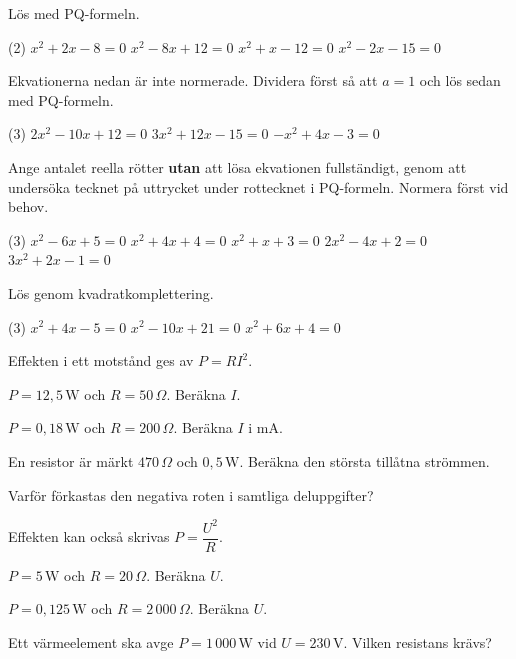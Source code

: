 Lös med PQ-formeln.
\begin{delar}(2)
  \task $x^2 + 2x - 8 = 0$
  \task $x^2 - 8x + 12 = 0$
  \task $x^2 + x - 12 = 0$
  \task $x^2 - 2x - 15 = 0$
\end{delar}

Ekvationerna nedan är inte normerade. Dividera först så att $a = 1$ och lös sedan med PQ-formeln.
\begin{delar}(3)
  \task $2x^2 - 10x + 12 = 0$
  \task $3x^2 + 12x - 15 = 0$
  \task $-x^2 + 4x - 3 = 0$
\end{delar}

Ange antalet reella rötter \textbf{utan} att lösa ekvationen fullständigt, genom att undersöka
tecknet på uttrycket under rottecknet i PQ-formeln. Normera först vid behov.
\begin{delar}(3)
  \task $x^2 - 6x + 5 = 0$
  \task $x^2 + 4x + 4 = 0$
  \task $x^2 + x + 3 = 0$
  \task $2x^2 - 4x + 2 = 0$
  \task $3x^2 + 2x - 1 = 0$
\end{delar}

Lös genom kvadratkomplettering.
\begin{delar}(3)
  \task $x^2 + 4x - 5 = 0$
  \task $x^2 - 10x + 21 = 0$
  \task $x^2 + 6x + 4 = 0$
\end{delar}

Effekten i ett motstånd ges av $P = RI^2$.
\begin{parts}
  \item $P = 12{,}5\,\text{W}$ och $R = 50\,\Omega$. Beräkna $I$.
  \item $P = 0{,}18\,\text{W}$ och $R = 200\,\Omega$. Beräkna $I$ i mA.
  \item En resistor är märkt $470\,\Omega$ och $0{,}5\,\text{W}$. Beräkna den största tillåtna
    strömmen.
  \item Varför förkastas den negativa roten i samtliga deluppgifter?
\end{parts}

Effekten kan också skrivas $P = \dfrac{U^2}{R}$.
\begin{parts}
  \item $P = 5\,\text{W}$ och $R = 20\,\Omega$. Beräkna $U$.
  \item $P = 0{,}125\,\text{W}$ och $R = 2\,000\,\Omega$. Beräkna $U$.
  \item Ett värmeelement ska avge $P = 1\,000\,\text{W}$ vid $U = 230\,\text{V}$. Vilken
    resistans krävs?
\end{parts}

